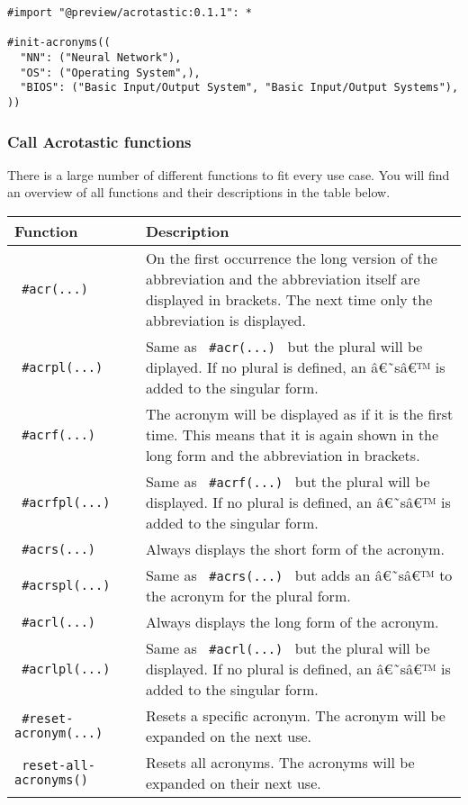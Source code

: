 \begin{verbatim}
#import "@preview/acrotastic:0.1.1": *

#init-acronyms((
  "NN": ("Neural Network"),
  "OS": ("Operating System",),
  "BIOS": ("Basic Input/Output System", "Basic Input/Output Systems"),
))
\end{verbatim}

\subsubsection{Call Acrotastic
functions}\label{call-acrotastic-functions}

There is a large number of different functions to fit every use case.
You will find an overview of all functions and their descriptions in the
table below.

\begin{longtable}[]{@{}ll@{}}
\toprule\noalign{}
Function & Description \\
\midrule\noalign{}
\endhead
\bottomrule\noalign{}
\endlastfoot
\texttt{\ \#acr(...)\ } & On the first occurrence the long version of
the abbreviation and the abbreviation itself are displayed in brackets.
The next time only the abbreviation is displayed. \\
\texttt{\ \#acrpl(...)\ } & Same as \texttt{\ \#acr(...)\ } but the
plural will be diplayed. If no plural is defined, an â€˜sâ€™ is added to
the singular form. \\
\texttt{\ \#acrf(...)\ } & The acronym will be displayed as if it is the
first time. This means that it is again shown in the long form and the
abbreviation in brackets. \\
\texttt{\ \#acrfpl(...)\ } & Same as \texttt{\ \#acrf(...)\ } but the
plural will be displayed. If no plural is defined, an â€˜sâ€™ is added
to the singular form. \\
\texttt{\ \#acrs(...)\ } & Always displays the short form of the
acronym. \\
\texttt{\ \#acrspl(...)\ } & Same as \texttt{\ \#acrs(...)\ } but adds
an â€˜sâ€™ to the acronym for the plural form. \\
\texttt{\ \#acrl(...)\ } & Always displays the long form of the
acronym. \\
\texttt{\ \#acrlpl(...)\ } & Same as \texttt{\ \#acrl(...)\ } but the
plural will be displayed. If no plural is defined, an â€˜sâ€™ is added
to the singular form. \\
\texttt{\ \#reset-acronym(...)\ } & Resets a specific acronym. The
acronym will be expanded on the next use. \\
\texttt{\ reset-all-acronyms()\ } & Resets all acronyms. The acronyms
will be expanded on their next use. \\
\end{longtable}

